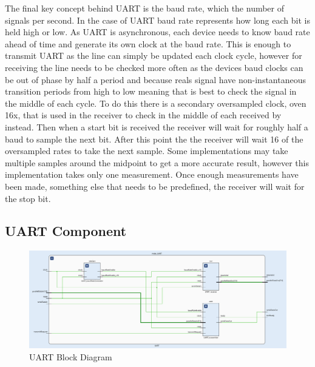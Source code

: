 \documentclass[11pt]{article}
\begin{document}
The final key concept behind UART is the baud rate, which the number of signals per second.
In the case of UART baud rate represents how long each bit is held high or low.
As UART is asynchronous, each device needs to know baud rate ahead of time and generate its own clock at the baud rate.
This is enough to transmit UART as the line can simply be updated each clock cycle,
however for receiving the line needs to be checked more often as the devices baud clocks can be out of phase by half a period and because reals signal have non-instantaneous transition periods from high to low meaning that is best to check the signal in the middle of each cycle.
To do this there is a secondary oversampled clock, oven 16x, that is used in the receiver to check in the middle of each received by instead.
Then when a start bit is received the receiver will wait for roughly half a baud to sample the next bit.
After this point the the receiver will wait 16 of the oversampled rates to take the next sample.
Some implementations may take multiple samples around the midpoint to get a more accurate result, however this implementation takes only one measurement.
Once enough measurements have been made, something else that needs to be predefined, the receiver will wait for the stop bit.


\subsection{UART Component}
\begin{figure}[H]        
    \centering
    \includegraphics[width=\textwidth]{uartImp.png}
    \caption{UART Block Diagram}
    \label{fig:UARTimp}
\end{figure} 
\end{document}
